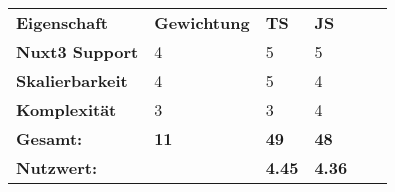 \begin{tabular}{llllll}
\rowcolor{heading}\textbf{Eigenschaft}   & \textbf{Gewichtung} & \textbf{TS} & \textbf{JS}\\
\textbf{Nuxt3 Support}                   & 4  & 5       & 5       \\
\rowcolor{odd}\textbf{Skalierbarkeit}     & 4  & 5       & 4       \\
\textbf{Komplexität}                     & 3  & 3       & 4       \\
\rowcolor{heading}\textbf{Gesamt:}       & \textbf{11} & \textbf{49} & \textbf{48} \\
\rowcolor{odd}\textbf{Nutzwert:}                        & & \textbf{4.45} & \textbf{4.36}\\
\end{tabular}
